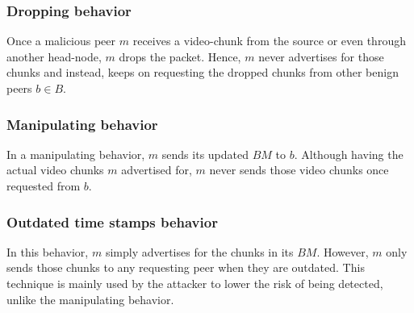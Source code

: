 \subsubsection*{Dropping behavior}
Once a malicious peer $m$ receives a video-chunk from the source or even through another head-node, $m$ drops the packet. 
Hence, $m$ never advertises for those chunks and instead, keeps on requesting the dropped chunks from other benign peers $b \in B$.

\subsubsection*{Manipulating behavior}
In a manipulating behavior, $m$ sends its updated $BM$ to $b$.
Although having the actual video chunks $m$ advertised for, $m$ never sends those video chunks once requested from $b$.

\subsubsection*{Outdated time stamps behavior}
In this behavior, $m$ simply advertises for the chunks in its $BM$. 
However, $m$ only sends those chunks to any requesting peer when they are outdated.
This technique is mainly used by the attacker to lower the risk of being detected, unlike the manipulating behavior.



